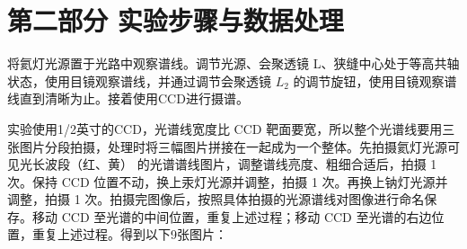 \documentclass{ctexart}
\begin{document}
    \section*{第二部分 \qquad 实验步骤与数据处理}
    将氦灯光源置于光路中观察谱线。调节光源、会聚透镜 L、狭缝中心处于等高共轴状态，使用目镜观察谱线，并通过调节会聚透镜 $L_2$ 的调节旋钮，使用目镜观察谱线直到清晰为止。接着使用CCD进行摄谱。

    实验使用1/2英寸的CCD，光谱线宽度比 CCD 靶面要宽，所以整个光谱线要用三张图片分段拍摄，处理时将三幅图片拼接在一起成为一个整体。先拍摄氦灯光源可见光长波段（红、黄） 的光谱谱线图片，调整谱线亮度、粗细合适后，拍摄 1 次。保持 CCD 位置不动，换上汞灯光源并调整，拍摄 1 次。再换上钠灯光源并调整，拍摄 1 次。拍摄完图像后，按照具体拍摄的光源谱线对图像进行命名保存。移动 CCD 至光谱的中间位置，重复上述过程；移动 CCD 至光谱的右边位置，重复上述过程。得到以下9张图片：
\end{document}
